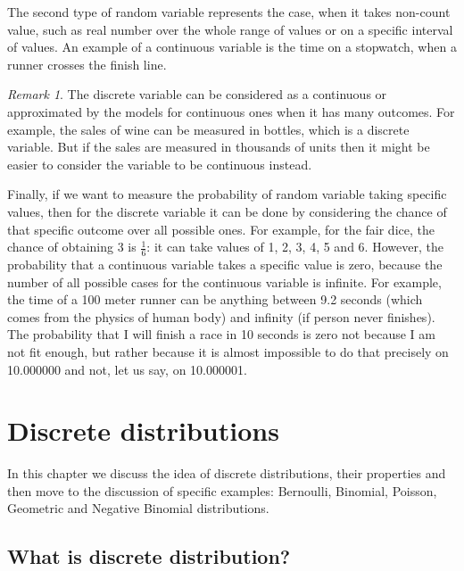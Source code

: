 \documentclass[
]{book}
\theoremstyle{definition}
\theoremstyle{definition}
\theoremstyle{definition}
\theoremstyle{definition}
\theoremstyle{remark}
\newtheorem*{remark}{Remark}
\begin{document}
The second type of random variable represents the case, when it takes non-count value, such as real number over the whole range of values or on a specific interval of values. An example of a continuous variable is the time on a stopwatch, when a runner crosses the finish line.

\begin{remark}
The discrete variable can be considered as a continuous or approximated by the models for continuous ones when it has many outcomes. For example, the sales of wine can be measured in bottles, which is a discrete variable. But if the sales are measured in thousands of units then it might be easier to consider the variable to be continuous instead.
\end{remark}

Finally, if we want to measure the probability of random variable taking specific values, then for the discrete variable it can be done by considering the chance of that specific outcome over all possible ones. For example, for the fair dice, the chance of obtaining 3 is \(\frac{1}{6}\): it can take values of 1, 2, 3, 4, 5 and 6. However, the probability that a continuous variable takes a specific value is zero, because the number of all possible cases for the continuous variable is infinite. For example, the time of a 100 meter runner can be anything between 9.2 seconds (which comes from the physics of human body) and infinity (if person never finishes). The probability that I will finish a race in 10 seconds is zero not because I am not fit enough, but rather because it is almost impossible to do that precisely on 10.000000 and not, let us say, on 10.000001.

\hypertarget{countDistributions}{%
\chapter{Discrete distributions}\label{countDistributions}}

In this chapter we discuss the idea of discrete distributions, their properties and then move to the discussion of specific examples: Bernoulli, Binomial, Poisson, Geometric and Negative Binomial distributions.

\hypertarget{what-is-discrete-distribution}{%
\section{What is discrete distribution?}\label{what-is-discrete-distribution}}
\end{document}
